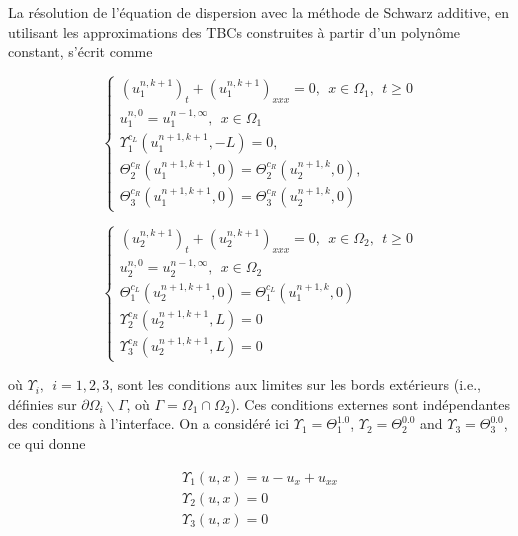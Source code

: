 \indent La résolution de l'équation de dispersion avec la méthode de Schwarz additive, en utilisant les approximations des TBCs construites à partir d'un polynôme constant, s'écrit comme

\begin{equation}
    \label{eq:problemDDM1}
    \begin{cases}
        (u_1^{n,k+1})_t + (u_1^{n,k+1})_{xxx} = 0 , \ \ x \in \Omega_1, \ \ t \geq 0\\
        u_1^{n,0} = u_1^{n-1,\infty} , \ \ x \in \Omega_1 \\
        \Upsilon_1^{c_L}(u_1^{n+1,k+1},-L) = 0, \\ 
        \Theta_2^{c_R}(u_1^{n+1,k+1},0) = \Theta_2^{c_R}(u_2^{n+1,k},0) , \\
        \Theta_3^{c_R}(u_1^{n+1,k+1},0) = \Theta_3^{c_R}(u_2^{n+1,k},0)
     \end{cases}
\end{equation}

\begin{equation}
    \label{eq:problemDDM2}
    \begin{cases}
        (u_2^{n,k+1})_t + (u_2^{n,k+1})_{xxx} = 0 , \ \ x \in \Omega_2, \ \ t \geq 0\\
        u_2^{n,0} = u_2^{n-1,\infty} , \ \ x \in \Omega_2 \\
        \Theta_1^{c_L}(u_2^{n+1,k+1},0) = \Theta_1^{c_L}(u_1^{n+1,k},0) \\
        \Upsilon_2^{c_R}(u_2^{n+1,k+1},L) = 0 \\
        \Upsilon_3^{c_R}(u_2^{n+1,k+1},L) = 0
     \end{cases}
\end{equation}

\noindent où $ \Upsilon_i, \ \ i=1,2,3$,  sont les conditions aux limites sur les bords extérieurs (i.e., définies sur $\partial \Omega_i \backslash \Gamma$, où $\Gamma = \Omega_1 \cap \Omega_2$). Ces conditions externes sont indépendantes des conditions à l'interface. On a considéré ici $\Upsilon_1 = \Theta_1^{1.0}$, $\Upsilon_2 = \Theta_2^{0.0}$ and $\Upsilon_3 = \Theta_3^{0.0}$, ce qui donne 

\begin{equation}
\label{eq:externalBCsDDM}
\begin{gathered}
	\Upsilon_1(u,x) = u - u_x + u_{xx} \\
	\Upsilon_2(u,x) = 0 \\
	\Upsilon_3(u,x) = 0
\end{gathered}
\end{equation}

